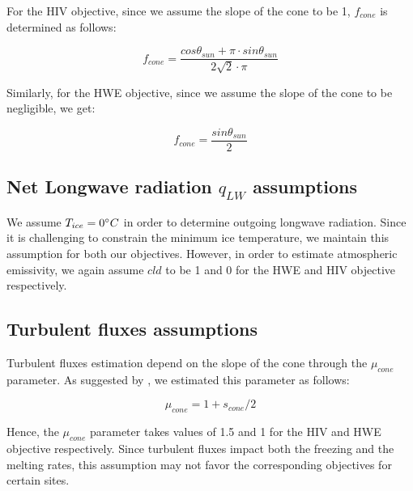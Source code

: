 \documentclass[tc, manuscript]{copernicus}
\begin{document}
For the HIV objective, since we assume the slope of the cone to be 1, $f_{cone}$ is determined as follows:

\begin{equation}
		f_{cone} =\frac{ cos \theta_{sun} + \pi \cdot sin \theta_{sun} }{2\sqrt{2} \cdot \pi }
\end{equation}

Similarly, for the HWE objective, since we assume the slope of the cone to be negligible, we get:

\begin{equation}
		f_{cone} =\frac{ sin \theta_{sun} }{2 }
\end{equation}

\subsection{Net Longwave radiation \texorpdfstring{$q_{LW}$}{Lg} assumptions} 

We assume $T_{ice} = 0 ^{\circ} C$ in order to determine outgoing longwave radiation. Since it is challenging to
constrain the minimum ice temperature, we maintain this assumption for both our objectives. However, in order to
estimate atmospheric emissivity, we again assume $cld$ to be 1 and 0 for the HWE and HIV objective respectively.

\subsection{Turbulent fluxes assumptions} \label{sec:Qs}

Turbulent fluxes estimation depend on the slope of the cone through the $\mu_{cone}$ parameter. As suggested 
by \citet{oerlemansBriefCommunicationGrowth2021}, we estimated this parameter as follows:

\begin{equation}
  \mu_{cone} =1 + s_{cone}/2
\end{equation}

Hence, the $\mu_{cone}$ parameter takes values of 1.5 and 1 for the HIV and HWE objective respectively.  Since
turbulent fluxes impact both the freezing and the melting rates, this assumption may not favor the corresponding
objectives for certain sites.

\appendixtables   %
\end{document}
